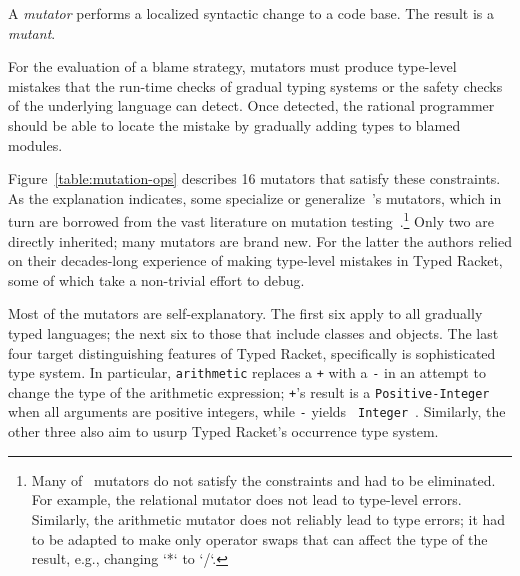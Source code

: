 
A {\it mutator\/} performs a localized syntactic change to a code base. The
result is a {\em mutant\/}.

For the evaluation of a blame strategy, mutators must produce type-level
mistakes that the run-time checks of gradual typing systems or the safety
checks of the underlying language can detect. Once detected, the rational
programmer should be able to locate the mistake by gradually adding types to
blamed modules.

Figure~\ref{table:mutation-ops} describes 16 mutators that satisfy these
constraints. As the explanation indicates, some specialize or
generalize~\citet{lksfd-popl-2020}'s mutators, which in turn are borrowed from
the vast literature on mutation testing~\cite{jia2011analysis}.\footnote{Many
of~\citet{lksfd-popl-2020} mutators do not satisfy the constraints and had to
be eliminated. For example, the relational mutator does not lead to type-level
errors. Similarly, the arithmetic mutator does not reliably lead to type
errors; it had to be adapted to make only operator swaps that can affect the
type of the result, e.g., changing `*` to `/`.}  Only two are directly
inherited; many mutators are brand new. For the latter the authors relied on
their decades-long experience of making type-level mistakes in Typed Racket,
some of which take a non-trivial effort to debug.

Most of the mutators are self-explanatory.  The first six apply to all
gradually typed languages; the next six to those that include classes and
objects. The last four target distinguishing features of Typed Racket,
specifically is sophisticated type system. In particular, {\tt arithmetic}
replaces a {\tt +} with a {\tt -} in an attempt to change the type of the
arithmetic expression; {\tt +}'s result is a {\tt Positive-Integer} when all
arguments are positive integers, while {\tt -} yields {\tt
Integer}~\cite{stathff-padl-12}. Similarly, the other three also aim to usurp
Typed Racket's occurrence type system.

